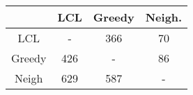 \begin{tabular}{| c | c | c | c | }
	\hline
	& LCL & Greedy & Neigh. \\
	\hline
	LCL& - & 366 & 70\\
	\hline
	Greedy & 426& - & 86\\
	\hline
	Neigh & 629 & 587& - \\
	\hline
\end{tabular}
